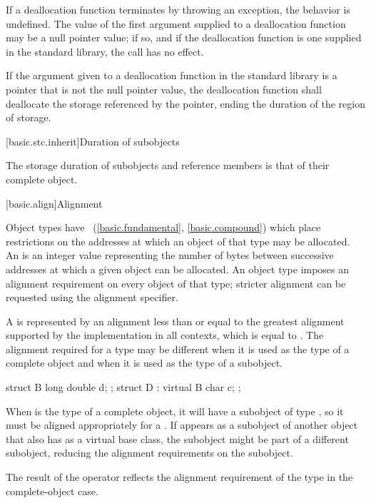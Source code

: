 \pnum
If a deallocation function terminates by throwing an exception, the behavior is undefined.
The value of the first argument supplied to a deallocation function may
be a null pointer value; if so, and if the deallocation function is one
supplied in the standard library, the call has no effect.

\pnum
If the argument given to a deallocation function in the standard library
is a pointer that is not the null pointer value, the
deallocation function shall deallocate the storage referenced by the
pointer, ending the duration of the region of storage.

[basic.stc.inherit]{Duration of subobjects}

\pnum
{}%
The storage duration of subobjects and reference members
is that of their complete object.
%

[basic.align]{Alignment}

\pnum
Object types have ~(\ref{basic.fundamental}, \ref{basic.compound})
which place restrictions on the addresses at which an object of that type
may be allocated. An  is an 
integer value representing the number of bytes between successive addresses
at which a given object can be allocated. An object type imposes an alignment
requirement on every object of that type; stricter alignment can be requested
using the alignment specifier.

\pnum
A  is represented by an alignment
less than or equal to the greatest alignment supported by the implementation in
all contexts, which is equal to
.
The alignment required for a type may be different when it is used as the type
of a complete object and when it is used as the type of a subobject.
\begin{example}
\begin{codeblock}
struct B { long double d; };
struct D : virtual B { char c; };
\end{codeblock}

When  is the type of a complete object, it will have a subobject of
type , so it must be aligned appropriately for a .
If  appears as a subobject of another object that also has 
as a virtual base class, the  subobject might be part of a different
subobject, reducing the alignment requirements on the  subobject.
\end{example}
The result of the  operator reflects the alignment
requirement of the type in the complete-object case.

